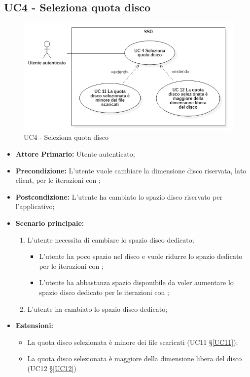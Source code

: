 \subsection{UC4 - Seleziona quota disco}
\begin{figure}[H]
    \centering
    \includegraphics[scale = 0.7]{components/img/UC4.png}
    \caption{UC4 - Seleziona quota disco}
\end{figure}
\begin{itemize}
\item \textbf{Attore Primario:} Utente autenticato;
\item \textbf{Precondizione:} L'utente vuole cambiare la dimensione disco riservata, lato client, per le iterazioni con ;
\item \textbf{Postcondizione:} L'utente ha cambiato lo spazio disco riservato per l'applicativo;
\item \textbf{Scenario principale:}
    \begin{enumerate}
    \item L'utente necessita di cambiare lo spazio disco dedicato;
        \begin{itemize}
        \item L'utente ha poco spazio nel disco e vuole ridurre lo spazio dedicato per le iterazioni con ;
        \item L'utente ha abbastanza spazio disponibile da voler aumentare lo spazio disco dedicato per le iterazioni con ;
        \end{itemize}
    \item L'utente ha cambiato lo spazio disco dedicato;
    \end{enumerate}
\item \textbf{Estensioni:}
    \begin{itemize}
        \item La quota disco selezionata è minore dei file scaricati (UC11 \S{}\ref{UC11});
        \item La quota disco selezionata è maggiore della dimensione libera del disco (UC12 \S{}\ref{UC12})
    \end{itemize}
\end{itemize}